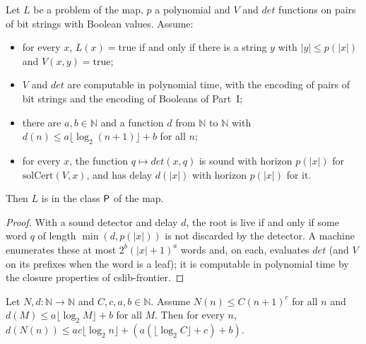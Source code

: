\begin{theorem}
  \label{thm:search-busqueda-en-P}
  \leanok
  Let $L$ be a problem of the map, $p$ a polynomial and $V$ and $\mathit{det}$ functions on pairs of
  bit strings with Boolean values. Assume:
  \begin{itemize}
    \item for every $x$, $L(x) = \mathrm{true}$ if and only if there is a string $y$ with
      $|y| \le p(|x|)$ and $V(x, y) = \mathrm{true}$;
    \item $V$ and $\mathit{det}$ are computable in polynomial time, with the encoding of pairs of
      bit strings and the encoding of Booleans of Part~I;
    \item there are $a, b \in \mathbb{N}$ and a function $d$ from $\mathbb{N}$ to $\mathbb{N}$ with
      $d(n) \le a \lfloor \log_2 (n+1) \rfloor + b$ for all $n$;
    \item for every $x$, the function $q \mapsto \mathit{det}(x, q)$ is sound with horizon $p(|x|)$ for
      $\mathrm{solCert}(V, x)$, and has delay $d(|x|)$ with horizon $p(|x|)$ for it.
  \end{itemize}
  Then $L$ is in the class $\mathsf{P}$ of the map.
  \own{}
\end{theorem}

\begin{proof}
  \leanok
  With a sound detector and delay $d$, the root is live if and only if some word $q$ of length
  $\min(d, p(|x|))$ is not discarded by the detector. A machine enumerates these at most
  $2^b(|x|+1)^a$ words and, on each, evaluates $\mathit{det}$ (and $V$ on its prefixes when the word
  is a leaf); it is computable in polynomial time by the closure properties of cslib-frontier.
\end{proof}

\begin{theorem}
  \label{thm:search-umbral-log}
  \leanok
  Let $N, d : \mathbb{N} \to \mathbb{N}$ and $C, c, a, b \in \mathbb{N}$. Assume $N(n) \le C(n+1)^c$
  for all $n$ and $d(M) \le a \lfloor \log_2 M \rfloor + b$ for all $M$. Then for every $n$,
  $d(N(n)) \le a c \lfloor \log_2 n \rfloor + (a(\lfloor \log_2 C \rfloor + c) + b)$.
  \own{}
\end{theorem}

